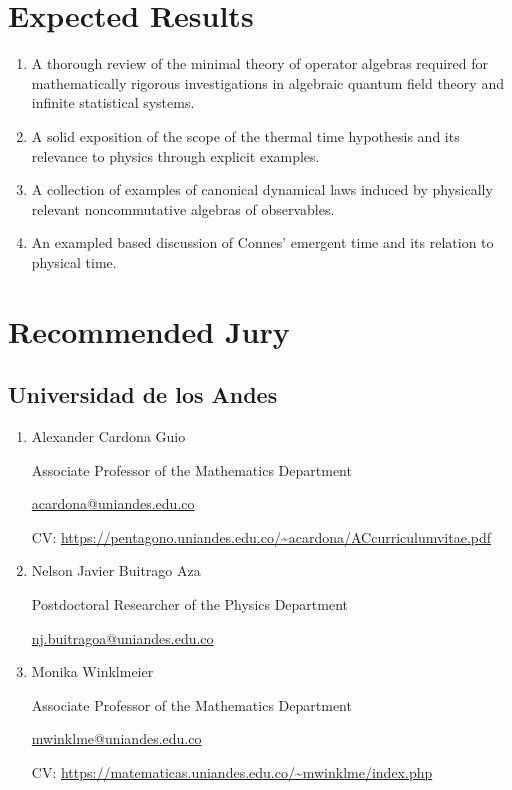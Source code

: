 \documentclass{article}
\begin{document}
\section{Expected Results}

\begin{enumerate}
\item A thorough review of the minimal theory of operator algebras required for mathematically rigorous investigations in algebraic quantum field theory and infinite statistical systems.
\item A solid exposition of the scope of the thermal time hypothesis and its relevance to physics through explicit examples.
\item A collection of examples of canonical dynamical laws induced by physically relevant noncommutative algebras of observables.
\item An exampled based discussion of Connes' emergent time and its relation to physical time.
\end{enumerate}

\section*{Recommended Jury}

\subsection*{Universidad de los Andes}

\begin{enumerate}

\item Alexander Cardona Guio

Associate Professor of the Mathematics Department

\href{mailto:acardona@uniandes.edu.co}{acardona@uniandes.edu.co}

CV: \url{https://pentagono.uniandes.edu.co/~acardona/ACcurriculumvitae.pdf}

\item Nelson Javier Buitrago Aza

Postdoctoral Researcher of the Physics Department

\href{mailto:nj.buitragoa@uniandes.edu.co}{nj.buitragoa@uniandes.edu.co}

\item Monika Winklmeier

Associate Professor of the Mathematics Department

\href{mailto:mwinklme@uniandes.edu.co}{mwinklme@uniandes.edu.co}

CV: \url{https://matematicas.uniandes.edu.co/~mwinklme/index.php} 

\end{enumerate}
\end{document}
